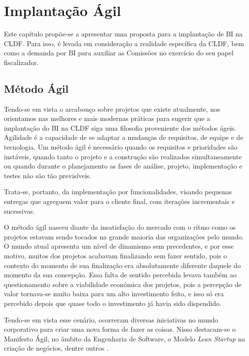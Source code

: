 \chapter{Implantação Ágil} 
\label{cap-proposta}

Este capítulo propõe-se a apresentar uma proposta para a implantação de BI na CLDF. Para isso, é levada em consideração a realidade específica da CLDF, bem como a demanda por BI para auxiliar as Comissões no exercício do seu papel fiscalizador.

\section{Método Ágil}
\label{sec-metodoagil}

Tendo-se em vista o arcabouço sobre projetos que existe atualmente, nos orientamos nas melhores e mais modernas práticas para sugerir que a implantação do BI na CLDF siga uma filosofia proveniente dos métodos ágeis. Agilidade é a capacidade de se adaptar a mudanças de requisitos, de equipe e de tecnologia. Um método ágil é necessário quando os requisitos e prioridades são instáveis, quando tanto o projeto e a construção são realizados simultaneamente ou quando durante o planejamento as fases de análise, projeto, implementação e testes não são tão previsíveis.

Trata-se, portanto, da implementação por funcionalidades, visando pequenas entregas que agreguem valor para o cliente final, com iterações incrementais e sucessivas.

O método ágil nasceu diante da insatisfação do mercado com o ritmo como os projetos estavam sendo tocados na grande maioria das organizações pelo mundo. O mundo atual apresenta um nível de dinamismo sem precedentes, e por esse motivo, muitos dos projetos acabavam finalizando sem fazer sentido, pois o contexto do momento de sua finalização era absolutamente diferente daquele do momento da sua concepção. Essa falta de sentido percebida levava também ao questionamento sobre a viabilidade econômica dos projetos, pois a percepção de valor tornava-se muito baixa para um alto investimento feito, e isso só era percebido depois que quase todo o investimento já havia sido dispendido.

Tendo-se em vista esse cenário, ocorreram diversas iniciativas no mundo corporativo para criar uma nova forma de fazer as coisas. Nisso destacam-se o Manifesto Ágil, no âmbito da Engenharia de Software, o Modelo \emph{Lean Startup} na criação de negócios, dentre outros \cite{prikladnicki2014}.


